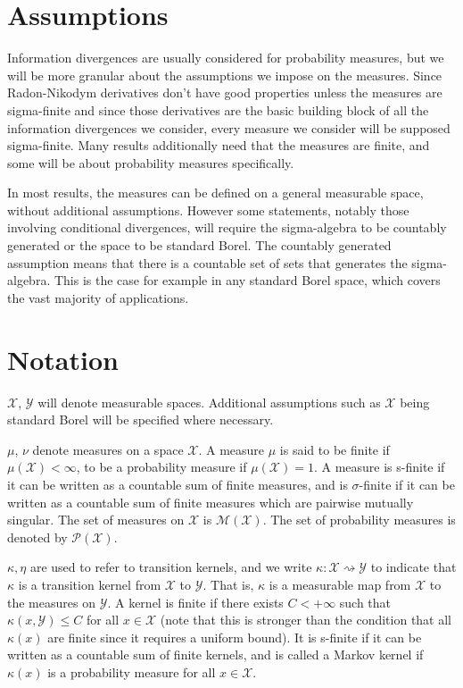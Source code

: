 \section*{Assumptions}

Information divergences are usually considered for probability measures, but we will be more granular about the assumptions we impose on the measures.
Since Radon-Nikodym derivatives don't have good properties unless the measures are sigma-finite and since those derivatives are the basic building block of all the information divergences we consider, every measure we consider will be supposed sigma-finite.
Many results additionally need that the measures are finite, and some will be about probability measures specifically.

In most results, the measures can be defined on a general measurable space, without additional assumptions.
However some statements, notably those involving conditional divergences, will require the sigma-algebra to be countably generated or the space to be standard Borel.
The countably generated assumption means that there is a countable set of sets that generates the sigma-algebra.
This is the case for example in any standard Borel space, which covers the vast majority of applications.

\section*{Notation}

$\mathcal X$, $\mathcal Y$ will denote measurable spaces. Additional assumptions such as $\mathcal X$ being standard Borel will be specified where necessary.

$\mu$, $\nu$ denote measures on a space $\mathcal X$. A measure $\mu$ is said to be finite if $\mu(\mathcal X) < \infty$, to be a probability measure if $\mu(\mathcal X) = 1$. A measure is s-finite if it can be written as a countable sum of finite measures, and is $\sigma$-finite if it can be written as a countable sum of finite measures which are pairwise mutually singular.
The set of measures on $\mathcal X$ is $\mathcal M(\mathcal X)$. The set of probability measures is denoted by $\mathcal P(\mathcal X)$.

$\kappa, \eta$ are used to refer to transition kernels, and we write $\kappa : \mathcal X \rightsquigarrow \mathcal Y$ to indicate that $\kappa$ is a transition kernel from $\mathcal X$ to $\mathcal Y$. That is, $\kappa$ is a measurable map from $\mathcal X$ to the measures on $\mathcal Y$.
A kernel is finite if there exists $C < + \infty$ such that $\kappa(x, \mathcal Y) \le C$ for all $x \in \mathcal X$ (note that this is stronger than the condition that all $\kappa(x)$ are finite since it requires a uniform bound). It is s-finite if it can be written as a countable sum of finite kernels, and is called a Markov kernel if $\kappa(x)$ is a probability measure for all $x \in \mathcal X$.


